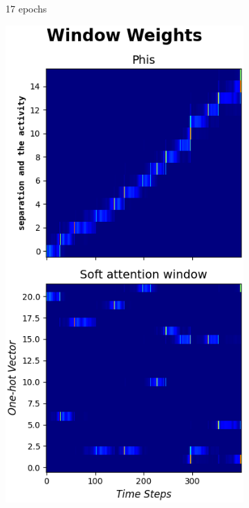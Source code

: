 \documentclass{article}
\begin{document}
\begin{figure}[hbt!]
\begin{subfigure}[b]{0.24\textwidth}
         \caption{17 epochs}
         \label{fig:weight_heatmaps:b}
     \end{subfigure}
     \hfill
     \begin{subfigure}[b]{0.24\textwidth}
         \centering
         \includegraphics[width=\textwidth]{heatmap_weights_200}

\end{subfigure}
\end{figure}
\end{document}
